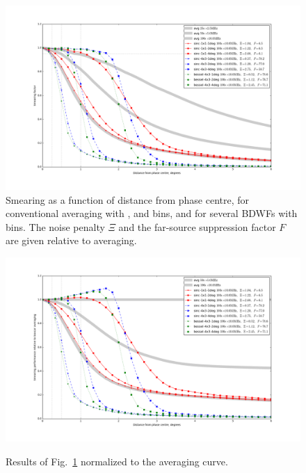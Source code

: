 \documentclass[useAMS,usenatbib]{mn2e}
\begin{document}
\begin{figure}
\includegraphics[width=\textwidth]{./Figures/suppression-10x100-3wfs.png}
\caption{Smearing as a function of distance from phase centre, for conventional averaging with 
,  and  bins, and for several BDWFs with  bins.
The noise penalty $\Xi$ and the far-source suppression factor $F$ are given relative to 
averaging.}
\label{fig:results-example}
\end{figure}

\begin{figure}
\includegraphics[width=\textwidth]{./Figures/relsuppression-10x100-3wfs.png}\\
\caption{Results of Fig.~\ref{fig:results-example} normalized to the  averaging curve.}
\label{fig:results-example2}
\end{figure}
\end{document}
